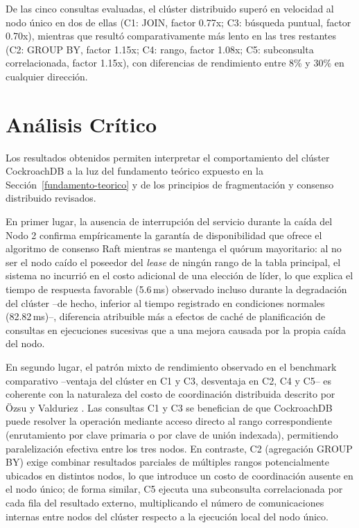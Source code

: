\documentclass[12pt, a4paper]{article}
\begin{document}
De las cinco consultas evaluadas, el clúster distribuido superó en velocidad al nodo único en dos de ellas (C1: JOIN, factor 0.77x; C3: búsqueda puntual, factor 0.70x), mientras que resultó comparativamente más lento en las tres restantes (C2: GROUP BY, factor 1.15x; C4: rango, factor 1.08x; C5: subconsulta correlacionada, factor 1.15x), con diferencias de rendimiento entre 8\% y 30\% en cualquier dirección.

\section{Análisis Crítico}
\label{analisis-critico}

Los resultados obtenidos permiten interpretar el comportamiento del clúster CockroachDB a la luz del fundamento teórico expuesto en la Sección~\ref{fundamento-teorico} y de los principios de fragmentación y consenso distribuido revisados.

En primer lugar, la ausencia de interrupción del servicio durante la caída del Nodo 2 confirma empíricamente la garantía de disponibilidad que ofrece el algoritmo de consenso Raft mientras se mantenga el quórum mayoritario: al no ser el nodo caído el poseedor del \textit{lease} de ningún rango de la tabla principal, el sistema no incurrió en el costo adicional de una elección de líder, lo que explica el tiempo de respuesta favorable (5.6\,ms) observado incluso durante la degradación del clúster --de hecho, inferior al tiempo registrado en condiciones normales (82.82\,ms)--, diferencia atribuible más a efectos de caché de planificación de consultas en ejecuciones sucesivas que a una mejora causada por la propia caída del nodo.

En segundo lugar, el patrón mixto de rendimiento observado en el benchmark comparativo --ventaja del clúster en C1 y C3, desventaja en C2, C4 y C5-- es coherente con la naturaleza del costo de coordinación distribuida descrito por Özsu y Valduriez \cite{ozsu2020principles}. Las consultas C1 y C3 se benefician de que CockroachDB puede resolver la operación mediante acceso directo al rango correspondiente (enrutamiento por clave primaria o por clave de unión indexada), permitiendo paralelización efectiva entre los tres nodos. En contraste, C2 (agregación GROUP BY) exige combinar resultados parciales de múltiples rangos potencialmente ubicados en distintos nodos, lo que introduce un costo de coordinación ausente en el nodo único; de forma similar, C5 ejecuta una subconsulta correlacionada por cada fila del resultado externo, multiplicando el número de comunicaciones internas entre nodos del clúster respecto a la ejecución local del nodo único.
\end{document}

